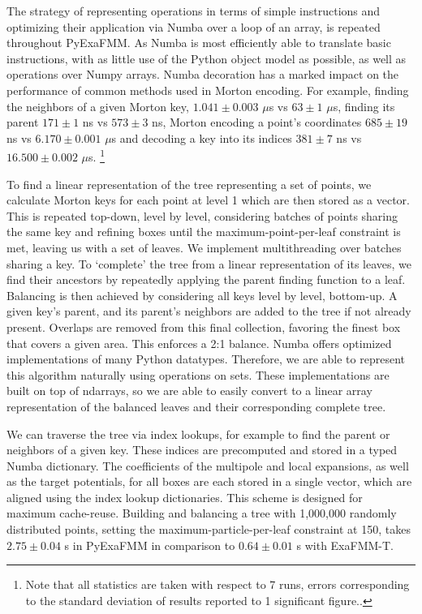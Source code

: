 \documentclass{IEEEcsmag}
\begin{document}
The strategy of representing operations in terms of simple instructions and optimizing their application via Numba over a loop of an array, is repeated throughout PyExaFMM. As Numba is most efficiently able to translate basic instructions, with as little use of the Python object model as possible, as well as operations over Numpy arrays. Numba decoration has a marked impact on the performance of common methods used in Morton encoding. For example, finding the neighbors of a given Morton key, $1.041 \pm 0.003$ $\mu$s vs  $63 \pm 1$ $\mu$s, finding its parent $171 \pm 1$ ns vs $573 \pm 3$ ns, Morton encoding a point's coordinates $685 \pm 19$ ns vs $6.170 \pm 0.001$ $\mu$s and decoding a key into its indices $381 \pm 7$ ns vs $16.500 \pm 0.002$ $\mu$s. \footnote[3]{Note that all statistics are taken with respect to 7 runs, errors corresponding to the standard deviation of results reported to 1 significant figure..}

To find a linear representation of the tree representing a set of points, we calculate Morton keys for each point at level 1 which are then stored as a vector. This is repeated top-down, level by level, considering batches of points sharing the same key and refining boxes until the maximum-point-per-leaf constraint is met, leaving us with a set of leaves. We implement multithreading over batches sharing a key. To `complete' the tree from a linear representation of its leaves, we find their ancestors by repeatedly applying the parent finding function to a leaf. Balancing is then achieved by considering all keys level by level, bottom-up. A given key's parent, and its parent's neighbors are added to the tree if not already present. Overlaps are removed from this final collection, favoring the finest box that covers a given area. This enforces a 2:1 balance. Numba offers optimized implementations of many Python datatypes. Therefore, we are able to represent this algorithm naturally using operations on sets. These implementations are built on top of ndarrays, so we are able to easily convert to a linear array representation of the balanced leaves and their corresponding complete tree.

We can traverse the tree via index lookups, for example to find the parent or neighbors of a given key. These indices are precomputed and stored in a typed Numba dictionary. The coefficients of the multipole and local expansions, as well as the target potentials, for all boxes are each stored in a single vector, which are aligned using the index lookup dictionaries. This scheme is designed for maximum cache-reuse.
Building and balancing a tree with 1,000,000 randomly distributed points, setting the maximum-particle-per-leaf constraint at 150, takes $2.75 \pm 0.04$ s in PyExaFMM in comparison to $0.64 \pm 0.01$ s with ExaFMM-T.
\end{document}
